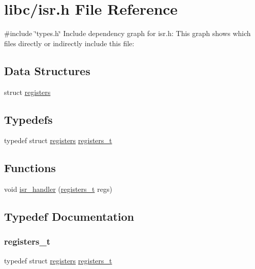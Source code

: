 \hypertarget{a00080}{}\section{libc/isr.h File Reference}
\label{a00080}
{\ttfamily \#include \char`\"{}types.\+h\char`\"{}}\newline
Include dependency graph for isr.\+h\+:
This graph shows which files directly or indirectly include this file\+:
\subsection*{Data Structures}
\begin{DoxyCompactItemize}
\item 
struct \hyperlink{a00162}{registers}
\end{DoxyCompactItemize}
\subsection*{Typedefs}
\begin{DoxyCompactItemize}
\item 
typedef struct \hyperlink{a00162}{registers} \hyperlink{a00080_adf58dbaf6139b4957c348711f2026957_adf58dbaf6139b4957c348711f2026957}{registers\+\_\+t}
\end{DoxyCompactItemize}
\subsection*{Functions}
\begin{DoxyCompactItemize}
\item 
void \hyperlink{a00080_a700e3ca056bf69296370f504f2cb6cc8_a700e3ca056bf69296370f504f2cb6cc8}{isr\+\_\+handler} (\hyperlink{a00080_adf58dbaf6139b4957c348711f2026957_adf58dbaf6139b4957c348711f2026957}{registers\+\_\+t} regs)
\end{DoxyCompactItemize}


\subsection{Typedef Documentation}
\mbox{\label{a00080_adf58dbaf6139b4957c348711f2026957_adf58dbaf6139b4957c348711f2026957}} 
\subsubsection{\texorpdfstring{registers\+\_\+t}{registers\_t}}
{\footnotesize\ttfamily typedef struct \hyperlink{a00162}{registers}  \hyperlink{a00080_adf58dbaf6139b4957c348711f2026957_adf58dbaf6139b4957c348711f2026957}{registers\+\_\+t}}



